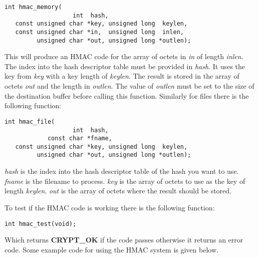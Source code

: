 \documentclass[synpaper]{book}
\begin{document}
\begin{verbatim}
int hmac_memory(
                   int  hash,
   const unsigned char *key, unsigned long  keylen,
   const unsigned char *in,  unsigned long  inlen,
         unsigned char *out, unsigned long *outlen);
\end{verbatim}
This will produce an HMAC code for the array of octets in \textit{in} of length \textit{inlen}.  The index into the hash descriptor
table must be provided in \textit{hash}.  It uses the key from \textit{key} with a key length of \textit{keylen}.
The result is stored in the array of octets \textit{out} and the length in \textit{outlen}.  The value of \textit{outlen} must be set
to the size of the destination buffer before calling this function.  Similarly for files there is the  following function:
\begin{verbatim}
int hmac_file(
                   int  hash,
            const char *fname,
   const unsigned char *key, unsigned long  keylen,
         unsigned char *out, unsigned long *outlen);
\end{verbatim}
\textit{hash} is the index into the hash descriptor table of the hash you want to use.  \textit{fname} is the filename to process.
\textit{key} is the array of octets to use as the key of length \textit{keylen}.  \textit{out} is the array of octets where the
result should be stored.

To test if the HMAC code is working there is the following function:
\begin{verbatim}
int hmac_test(void);
\end{verbatim}
Which returns {\bf CRYPT\_OK} if the code passes otherwise it returns an error code.  Some example code for using the
HMAC system is given below.
\end{document}
